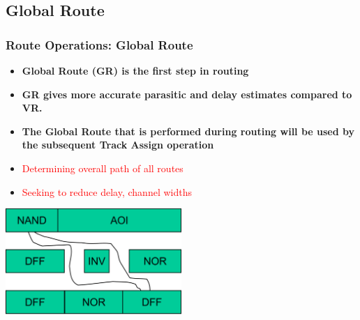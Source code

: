 \documentclass[compress]{beamer}
\begin{document}
\subsection[Global]{Global Route}
\begin{frame}
	\frametitle{Route Operations: Global Route}
	\begin{itemize}
		\item \textbf{Global Route (GR) is the first step in routing}
		\item \textbf{GR gives more accurate parasitic and delay estimates compared to VR.}
		\item \textbf{The Global Route that is performed during routing will be used by the subsequent Track Assign operation}
		\item \textcolor{red}{Determining overall path of all routes}
		\item \textcolor{red}{Seeking to reduce delay, channel widths}
	\end{itemize}
	\begin{center}
		\includegraphics[width=0.5\textwidth]{GLOBAL}
	\end{center}
\end{frame}
\end{document}
